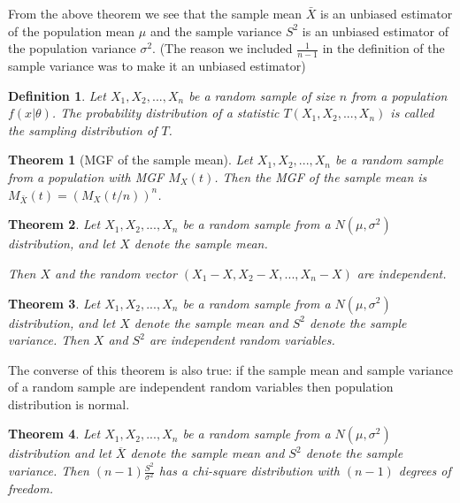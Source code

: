 \documentclass[14pt,twoside]{extreport}
\theoremstyle{dotless}
\newtheorem*{defn}{\footnotesize Definition}
\newtheorem*{thm}{\footnotesize Theorem} %
\begin{document}
From the above theorem we see that the sample mean $\bar{X}$ is an unbiased estimator of the population mean $\mu$ and the sample variance $S^2$ is an unbiased estimator of the population variance $\sigma^2$. (The reason we included $\frac{1}{n-1}$ in the  definition of the sample variance was to make it an unbiased estimator)

\begin{defn}
    Let $X_1, X_2, ..., X_n$ be a random sample of size $n$ from a population $f(x|\theta)$. The probability distribution of a statistic $T(X_1, X_2, ..., X_n)$ is called the sampling distribution of $T$.
\end{defn}

\begin{thm}[MGF of the sample mean]
    Let $X_1, X_2, ..., X_n$ be a random sample from a population with MGF $M_X(t)$. Then the MGF of the sample mean is $M_{\bar{X}} (t) = (M_X (t/n))^n$.
\end{thm}

\begin{thm}
    Let $X_1, X_2, . . . , X_n$ be a random sample from a $N(\mu, \sigma^2)$ distribution, and let $X$ denote the sample mean.

    Then $X$ and the random vector $(X_1 - X, X_2 - X, . . . , X_n - X)$ are independent.
\end{thm}

\begin{thm}
    Let $X_1, X_2, . . . , X_n$ be a random sample from a $N(\mu, \sigma^2)$ distribution, 
    and let $X$ denote the sample mean and $S^2$ denote the sample variance. Then $X$ and $S^2$ are independent random variables.
\end{thm}
The converse of this theorem is also true: if the sample mean and sample variance of a random sample are independent random variables then population distribution is normal.

\begin{thm}
    Let $X_1, X_2, ... , X_n$ be a random sample from a $N(\mu, \sigma^2)$ distribution and let $\overline{X}$ denote the sample mean and $S^2$ denote the sample variance. Then $(n-1) \frac{S^2}{\sigma^2}$ has a chi-square distribution with $(n-1)$ degrees of freedom.
\end{thm}
\end{document}
